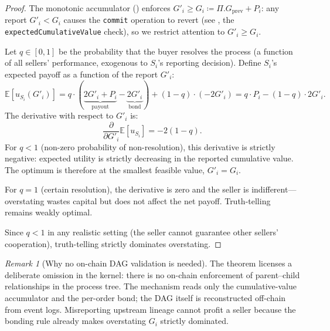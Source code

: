 \documentclass[11pt,a4paper]{article}
\theoremstyle{definition}
\theoremstyle{remark}
\newtheorem{remark}[theorem]{Remark}
\newcommand{\pay}{P}           %
\newcommand{\cumval}{G}        %
\begin{document}
\begin{proof}
The monotonic accumulator () enforces
$\cumval'_i \geq \cumval_i \coloneqq \Pi.\cumval_{\text{prev}} + \pay_i$:
any report $\cumval'_i < \cumval_i$ causes the \texttt{commit}
operation to revert
(see , the
\texttt{expectedCumulativeValue} check), so we restrict attention to
$\cumval'_i \geq \cumval_i$.

Let $q \in [0, 1]$ be the probability that the buyer resolves the
process (a function of all sellers' performance, exogenous to $S_i$'s
reporting decision). Define $S_i$'s expected payoff as a function of
the report $\cumval'_i$:
\begin{equation}
  \mathbb{E}[u_{S_i}(\cumval'_i)]
    = q \cdot (\underbrace{2\cumval'_i + \pay_i}_{\text{payout}}
             - \underbrace{2\cumval'_i}_{\text{bond}})
    + (1 - q) \cdot (-2\cumval'_i)
    = q \cdot \pay_i - (1 - q) \cdot 2\cumval'_i.
  \label{eq:dag-expected-utility}
\end{equation}
The derivative with respect to $\cumval'_i$ is:
\begin{equation}
  \frac{\partial}{\partial \cumval'_i}
    \mathbb{E}[u_{S_i}] = -2(1 - q).
  \label{eq:dag-derivative}
\end{equation}
For $q < 1$ (non-zero probability of non-resolution), this derivative
is strictly negative: expected utility is strictly decreasing in the
reported cumulative value. The optimum is therefore at the smallest
feasible value, $\cumval'_i = \cumval_i$.

For $q = 1$ (certain resolution), the derivative is zero and the
seller is indifferent---overstating wastes capital but does not
affect the net payoff. Truth-telling remains weakly optimal.

Since $q < 1$ in any realistic setting (the seller cannot guarantee
other sellers' cooperation), truth-telling strictly dominates
overstating.
\end{proof}

\begin{remark}[Why no on-chain DAG validation is needed]
The theorem licenses a deliberate omission in the kernel: there is
no on-chain enforcement of parent--child relationships in the
process tree. The mechanism reads only the cumulative-value
accumulator and the per-order bond; the DAG itself is reconstructed
off-chain from event logs. Misreporting upstream lineage cannot
profit a seller because the bonding rule already makes overstating
$\cumval_i$ strictly dominated.
\end{remark}
\end{document}
